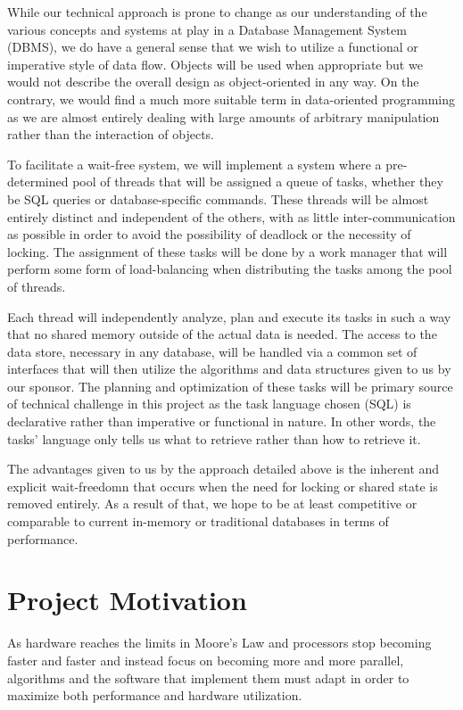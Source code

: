 \documentclass[letterpaper]{article}
\begin{document}
While our technical approach is prone to change as our understanding of the various concepts
and systems at play in a Database Management System (DBMS), we do have a general sense that we
wish to utilize a functional or imperative style of data flow. Objects will be used when appropriate
but we would not describe the overall design as object-oriented in any way. On the contrary, we would 
find a much more suitable term in data-oriented programming as we are almost entirely dealing
with large amounts of arbitrary manipulation rather than the interaction of objects.

To facilitate a wait-free system, we will implement a system where a pre-determined pool of threads
that will be assigned a queue of tasks, whether they be SQL queries or database-specific commands.
These threads will be almost entirely distinct and independent of the others, with as little
inter-communication as possible in order to avoid the possibility of deadlock or the necessity of
locking. The assignment of these tasks will be done by a work manager that will perform some form 
of load-balancing when distributing the tasks among the pool of threads.

Each thread will independently analyze, plan and execute its tasks in such a way that no shared memory
outside of the actual data is needed. The access to the data store, necessary in any database, 
will be handled via a common set of interfaces that will then utilize the algorithms and data structures
given to us by our sponsor. The planning and optimization of these tasks will be primary source 
of technical challenge in this project as the task language chosen (SQL) is declarative rather
than imperative or functional in nature. In other words, the tasks' language only tells us what
to retrieve rather than how to retrieve it.

The advantages given to us by the approach detailed above is the inherent and explicit wait-freedomn
that occurs when the need for locking or shared state is removed entirely. As a result of that, we 
hope to be at least competitive or comparable to current in-memory or traditional databases in terms
of performance.

\newpage

\section{Project Motivation}
As hardware reaches the limits in Moore's Law and processors stop becoming faster and faster
and instead focus on becoming more and more parallel, algorithms and the software that implement
them must adapt in order to maximize both performance and hardware utilization.
\end{document}
